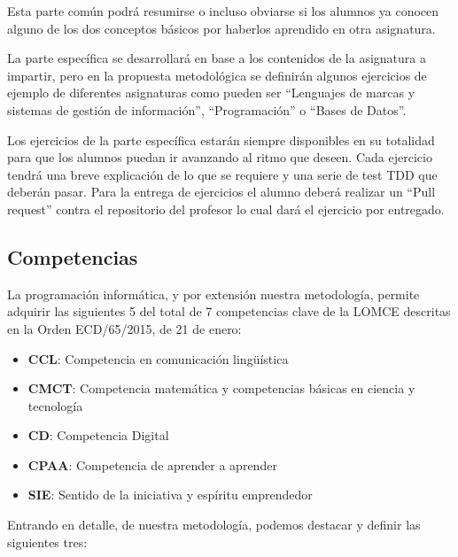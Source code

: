 Esta parte común podrá resumirse o incluso obviarse si los alumnos ya conocen alguno de los dos conceptos básicos por haberlos aprendido en otra asignatura.

\bigskip
La parte específica se desarrollará en base a los contenidos de la asignatura a impartir, pero en la propuesta metodológica se definirán algunos ejercicios de ejemplo de diferentes asignaturas como pueden ser ``Lenguajes de marcas y sistemas de gestión de información'', ``Programación'' o ``Bases de Datos''.

\bigskip
Los ejercicios de la parte específica estarán siempre disponibles en su totalidad para que los alumnos puedan ir avanzando al ritmo que deseen. Cada ejercicio tendrá una breve explicación de lo que se requiere y una serie de test TDD que deberán pasar. Para la entrega de ejercicios el alumno deberá realizar un ``Pull request'' contra el repositorio del profesor lo cual dará el ejercicio por entregado.

\subsection{Competencias}

La programación informática, y por extensión nuestra metodología, permite adquirir las siguientes 5 del total de 7 competencias clave de la LOMCE descritas en la Orden ECD/65/2015, de 21 de enero:

\begin{itemize}
    \item \textbf{CCL}: Competencia en comunicación lingüística
    \item \textbf{CMCT}: Competencia matemática y competencias básicas en ciencia y tecnología
    \item \textbf{CD}: Competencia Digital
    \item \textbf{CPAA}: Competencia de aprender a aprender
    \item \textbf{SIE}: Sentido de la iniciativa y espíritu emprendedor
\end{itemize}

Entrando en detalle, de nuestra metodología, podemos destacar y definir las siguientes tres:

